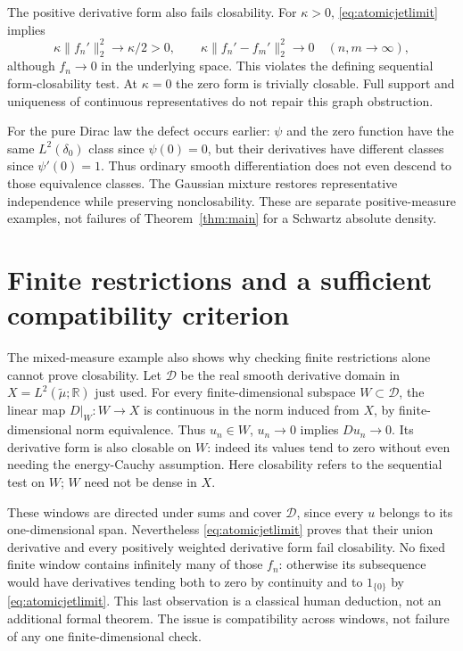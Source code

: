 \documentclass[11pt]{article}
\newcommand{\R}{\mathbb R}\newcommand{\C}{\mathbb C}
\begin{document}
The positive derivative form also fails closability. For $\kappa>0$,
\eqref{eq:atomicjetlimit} implies
\[
 \kappa\|f_n'\|_2^2\longrightarrow\kappa/2>0,
 \qquad \kappa\|f_n'-f_m'\|_2^2\longrightarrow0
 \quad(n,m\to\infty),
\]
although $f_n\to0$ in the underlying space. This violates the
defining sequential form-closability test. At $\kappa=0$ the
zero form is trivially closable. Full support and uniqueness of
continuous representatives do not repair this graph obstruction.

For the pure Dirac law the defect occurs earlier: $\psi$ and
the zero function have the same $L^2(\delta_0)$ class since
$\psi(0)=0$, but their derivatives have different classes since
$\psi'(0)=1$. Thus ordinary smooth differentiation does not even
descend to those equivalence classes. The Gaussian mixture restores
representative independence while preserving nonclosability.
These are separate positive-measure examples, not failures of
Theorem~\ref{thm:main} for a Schwartz absolute density.


\section{Finite restrictions and a sufficient compatibility criterion}
The mixed-measure example also shows why checking finite restrictions
alone cannot prove closability. Let $\mathcal D$ be the real smooth
derivative domain in $X=L^2(\widetilde\mu;\R)$ just used. For every
finite-dimensional subspace $W\subset\mathcal D$, the linear map
$D|_W:W\to X$ is continuous in the norm induced from $X$, by
finite-dimensional norm equivalence. Thus $u_n\in W$, $u_n\to0$
implies $Du_n\to0$. Its derivative form is also closable on $W$:
indeed its values tend to zero without even needing the energy-Cauchy
assumption. Here closability refers to the sequential test on $W$;
$W$ need not be dense in $X$.

These windows are directed under sums and cover $\mathcal D$, since
every $u$ belongs to its one-dimensional span. Nevertheless
\eqref{eq:atomicjetlimit} proves that their union derivative and
every positively weighted derivative form fail closability. No fixed
finite window contains infinitely many of those $f_n$: otherwise its
subsequence would have derivatives tending both to zero by continuity
and to $1_{\{0\}}$ by \eqref{eq:atomicjetlimit}. This last observation
is a classical human deduction, not an additional formal theorem.
The issue is compatibility across windows, not failure of any one
finite-dimensional check.
\end{document}
